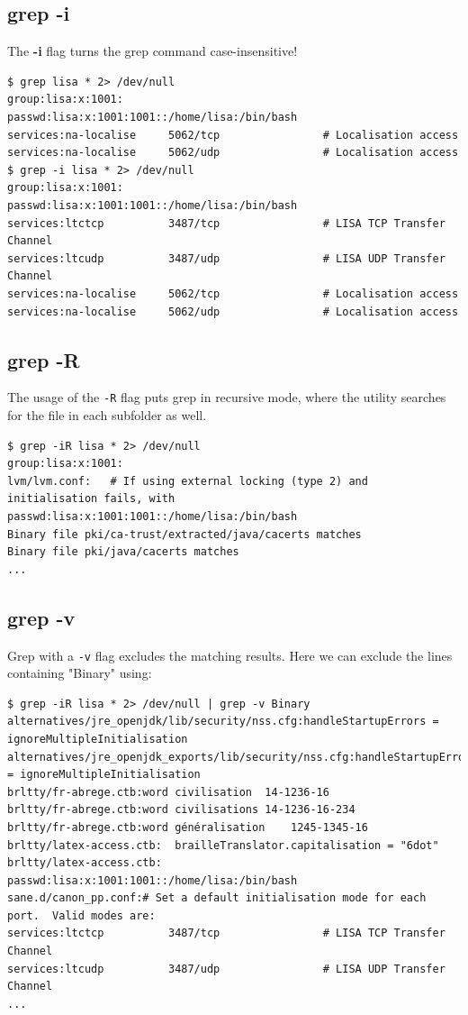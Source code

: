 \subsection{grep -i}
The \textbf{-i} flag turns the grep command case-insensitive!

\begin{verbatim}
$ grep lisa * 2> /dev/null
group:lisa:x:1001:
passwd:lisa:x:1001:1001::/home/lisa:/bin/bash
services:na-localise     5062/tcp                # Localisation access
services:na-localise     5062/udp                # Localisation access
$ grep -i lisa * 2> /dev/null
group:lisa:x:1001:
passwd:lisa:x:1001:1001::/home/lisa:/bin/bash
services:ltctcp          3487/tcp                # LISA TCP Transfer Channel
services:ltcudp          3487/udp                # LISA UDP Transfer Channel
services:na-localise     5062/tcp                # Localisation access
services:na-localise     5062/udp                # Localisation access
\end{verbatim}

\subsection{grep -R}
The usage of the \verb|-R| flag puts grep in recursive mode, where the utility searches for the file in each subfolder as well. 

\begin{verbatim}
$ grep -iR lisa * 2> /dev/null
group:lisa:x:1001:
lvm/lvm.conf:	# If using external locking (type 2) and initialisation fails, with
passwd:lisa:x:1001:1001::/home/lisa:/bin/bash
Binary file pki/ca-trust/extracted/java/cacerts matches
Binary file pki/java/cacerts matches
...
\end{verbatim}

\subsection{grep -v}
Grep with a \verb|-v| flag excludes the matching results. Here we can exclude the lines containing "Binary" using:

\begin{verbatim}
$ grep -iR lisa * 2> /dev/null | grep -v Binary
alternatives/jre_openjdk/lib/security/nss.cfg:handleStartupErrors = ignoreMultipleInitialisation
alternatives/jre_openjdk_exports/lib/security/nss.cfg:handleStartupErrors = ignoreMultipleInitialisation
brltty/fr-abrege.ctb:word civilisation	14-1236-16
brltty/fr-abrege.ctb:word civilisations	14-1236-16-234
brltty/fr-abrege.ctb:word généralisation	1245-1345-16
brltty/latex-access.ctb:  brailleTranslator.capitalisation = "6dot"
brltty/latex-access.ctb:      
passwd:lisa:x:1001:1001::/home/lisa:/bin/bash
sane.d/canon_pp.conf:# Set a default initialisation mode for each port.  Valid modes are:
services:ltctcp          3487/tcp                # LISA TCP Transfer Channel
services:ltcudp          3487/udp                # LISA UDP Transfer Channel
...
\end{verbatim}

